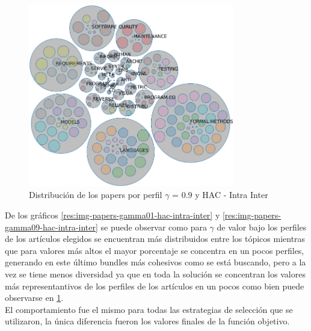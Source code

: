 \begin{figure}[H]
  \centering
    \includegraphics[width=0.8\textwidth]{resultados/papers/HAC/INTRA_INTER/bubbles-gamma-09.png}
  \caption{Distribución de los papers por perfil $\gamma$ = $0.9$ y HAC - Intra Inter}
  \label{res:img-papers-bubbles-gamma09-hac-intra-inter}
\end{figure}

De los gráficos \ref{res:img-papers-gamma01-hac-intra-inter} y \ref{res:img-papers-gamma09-hac-intra-inter} se puede observar como para $\gamma$ de valor bajo los perfiles de los artículos elegidos se encuentran más distribuidos entre los tópicos mientras que para valores más altos el mayor porcentaje se concentra en un pocos perfiles, generando en este último bundles más cohesivos como se está buscando, pero a la vez se tiene menos diversidad ya que en toda la solución se concentran los valores más representantivos de los perfiles de los artículos en un pocos como bien puede observarse en \ref{res:img-papers-bubbles-gamma09-hac-intra-inter}.\\
El comportamiento fue el mismo para todas las estrategias de selección que se utilizaron, la única diferencia fueron los valores finales de la función objetivo.

